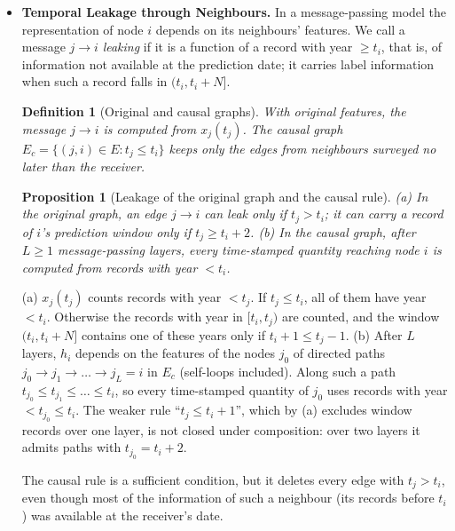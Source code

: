 \documentclass[a4paper,fleqn]{cas-sc}
\newtheorem{definition}{Definition}
\newtheorem{proposition}{Proposition}
\begin{document}
\begin{itemize}[leftmargin=1.4em]
\item \textbf{Temporal Leakage through Neighbours.} In a message-passing model the representation of node $i$ depends on its neighbours' features. We call a message $j \to i$ \emph{leaking} if it is a function of a record with year $\geq t_i$, that is, of information not available at the prediction date; it carries label information when such a record falls in $(t_i, t_i+N]$.

\begin{definition}[Original and causal graphs]
With original features, the message $j \to i$ is computed from $x_j(t_j)$. The causal graph $E_c = \{(j,i) \in E : t_j \leq t_i\}$ keeps only the edges from neighbours surveyed no later than the receiver.
\end{definition}

\begin{proposition}[Leakage of the original graph and the causal rule]
\label{prop:causal}
(a) In the original graph, an edge $j \to i$ can leak only if $t_j > t_i$; it can carry a record of $i$'s prediction window only if $t_j \geq t_i + 2$. (b) In the causal graph, after $L \geq 1$ message-passing layers, every time-stamped quantity reaching node $i$ is computed from records with year $< t_i$.
\end{proposition}

\begin{pf}
(a) $x_j(t_j)$ counts records with year $< t_j$. If $t_j \leq t_i$, all of them have year $< t_i$. Otherwise the records with year in $[t_i, t_j)$ are counted, and the window $(t_i, t_i+N]$ contains one of these years only if $t_i + 1 \leq t_j - 1$. (b) After $L$ layers, $h_i$ depends on the features of the nodes $j_0$ of directed paths $j_0 \to j_1 \to \dots \to j_L = i$ in $E_c$ (self-loops included). Along such a path $t_{j_0} \leq t_{j_1} \leq \dots \leq t_i$, so every time-stamped quantity of $j_0$ uses records with year $< t_{j_0} \leq t_i$. The weaker rule ``$t_j \leq t_i + 1$'', which by (a) excludes window records over one layer, is not closed under composition: over two layers it admits paths with $t_{j_0} = t_i + 2$.
\end{pf}

The causal rule is a sufficient condition, but it deletes every edge with $t_j > t_i$, even though most of the information of such a neighbour (its records before $t_i$) was available at the receiver's date.


\end{itemize}
\end{document}
